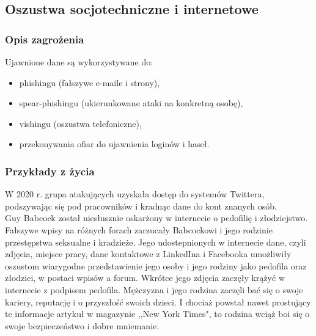 \subsection{Oszustwa socjotechniczne i internetowe}
\subsubsection{Opis zagrożenia}
Ujawnione dane są wykorzystywane do:
\begin{itemize}
  \item phishingu (fałszywe e-maile i strony),
  \item spear-phishingu (ukierunkowane ataki na konkretną osobę),
  \item vishingu (oszustwa telefoniczne),
  \item przekonywania ofiar do ujawnienia loginów i haseł.
\end{itemize}

\subsubsection{Przykłady z życia}
W 2020 r. grupa atakujących uzyskała dostęp do systemów Twittera, podszywając się pod pracowników i kradnąc dane do kont znanych osób.\\

Guy Babcock został niesłusznie oskarżony w internecie o pedofilię i złodziejstwo. Fałszywe wpisy na różnych forach zarzucały Babcockowi i jego rodzinie przestępstwa seksualne i kradzieże. Jego udostepnionych w internecie dane, czyli zdjęcia, miejsce pracy, dane kontaktowe z LinkedIna i Facebooka umożliwiły oszustom wiarygodne przedstawienie jego osoby i jego rodziny jako pedofila oraz złodziei, w postaci wpisów a forum. Wkrótce jego zdjęcia zaczęły krążyć w internecie z podpisem pedofila. Mężczyzna i jego rodzina zaczęli bać się o swoje kariery, reputację i o przyszłość swoich dzieci. I chociaż powstał nawet prostujący te informacje artykuł w magazynie ,,New York Times", to rodzina wciąż boi się o swoje bezpieczeństwo i dobre mniemanie.

